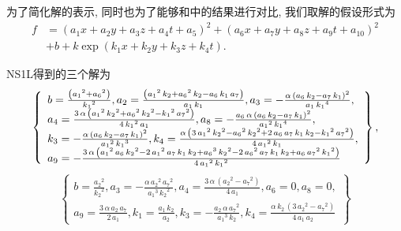 为了简化解的表示, 同时也为了能够和中的结果进行对比, 我们取解的假设形式为
\begin{equation}
\begin{split}
    f&=(a_1 x+a_2 y+a_3 z+ a_4 t +a_5)^2+(a_6 x+a_7 y+a_8 z+ a_9 t +a_{10})^2 \\
    &+b+k \exp(k_1 x + k_2 y +k_3 z+ k_4 t).
\end{split}
\end{equation}

NS1L得到的三个解为
\begin{eqnarray}
\renewcommand{\arraystretch}{1.2}
\left\{
\begin{array}{l}
b=\frac{\left( {{{a}_{1}}}^{2}+{{{a}_{6}}}^{2}\right) }{{{{k}_{1}}}^{2}},
{{a}_{2}}=\frac{\left( {{{a}_{1}}}^{2}\,{{k}_{2}}+{{{a}_{6}}}^{2}\,{{k}_{2}}-{{a}_{6}}\,{{k}_{1}}\,{{a}_{7}}\right) }{{{a}_{1}}\,{{k}_{1}}},
{{a}_{3}}=-\frac{\alpha\,\left( {{a}_{6}}\,{{k}_{2}}-{{a}_{7}}\,{{k}_{1}}\right) ^{2}}{{{a}_{1}}\,{{{k}_{1}}}^{4}},\\
{{a}_{4}}=\frac{3\,\alpha\,\left( {{{a}_{1}}}^{2}\,{{{k}_{2}}}^{2}+{{{a}_{6}}}^{2}\,{{{k}_{2}}}^{2}-{{{k}_{1}}}^{2}\,{{{a}_{7}}}^{2}\right) }{4\,{{{k}_{1}}}^{2}\,{{a}_{1}}},
{{a}_{8}}=-\frac{{{a}_{6}}\,\alpha\,\left( {{a}_{6}}\,{{k}_{2}}-{{a}_{7}}\,{{k}_{1}}\right) ^{2}}{{{{a}_{1}}}^{2}\,{{{k}_{1}}}^{4}},\\
{{k}_{3}}=-\frac{\alpha\,\left( {{a}_{6}}\,{{k}_{2}}-{{a}_{7}}\,{{k}_{1}}\right) ^{2}}{{{{a}_{1}}}^{2}\,{{{k}_{1}}}^{3}},
{{k}_{4}}=\frac{\alpha\,\left( 3\,{{{a}_{1}}}^{2}\,{{{k}_{2}}}^{2}-{{{a}_{6}}}^{2}\,{{{k}_{2}}}^{2}+2\,{{a}_{6}}\,{{a}_{7}}\,{{k}_{1}}\,{{k}_{2}}-{{{k}_{1}}}^{2}\,{{{a}_{7}}}^{2}\right) }{4\,{{{a}_{1}}}^{2}\,{{k}_{1}}},\\
{{a}_{9}}=-\frac{3\,\alpha\,\left( {{{a}_{1}}}^{2}\,{{a}_{6}}\,{{{k}_{2}}}^{2}-2\,{{{a}_{1}}}^{2}\,{{a}_{7}}\,{{k}_{1}}\,{{k}_{2}}+{{{a}_{6}}}^{3}\,{{{k}_{2}}}^{2}-2\,{{{a}_{6}}}^{2}\,{{a}_{7}}\,{{k}_{1}}\,{{k}_{2}}+{{a}_{6}}\,{{{a}_{7}}}^{2}\,{{{k}_{1}}}^{2}\right) }{4\,{{{a}_{1}}}^{2}\,{{{k}_{1}}}^{2}}\\
\end{array}
\right\}, \label{1S1L-1}
\end{eqnarray}
\begin{equation}
\renewcommand{\arraystretch}{1.2}
\left\{
\begin{array}{l}  
b=\frac{{{{a}_{2}}}^{2}}{{{{k}_{2}}}^{2}},
{{a}_{3}}=-\frac{\alpha\,{{{a}_{2}}}^{2}\,{{{a}_{7}}}^{2}}{{{{a}_{1}}}^{3}\,{{{k}_{2}}}^{2}},
{{a}_{4}}=\frac{3\,\alpha\,\left( {{{a}_{2}}}^{2}-{{{a}_{7}}}^{2}\right) }{4\,{{a}_{1}}},
{{a}_{6}}=0,
{{a}_{8}}=0,\\
{{a}_{9}}=\frac{3\,\alpha\,{{a}_{2}}\,{{a}_{7}}}{2\,{{a}_{1}}},
{{k}_{1}}=\frac{{{a}_{1}}\,{{k}_{2}}}{{{a}_{2}}},
{{k}_{3}}=-\frac{{{a}_{2}}\,\alpha\,{{{a}_{7}}}^{2}}{{{{a}_{1}}}^{3}\,{{k}_{2}}},
{{k}_{4}}=\frac{\alpha\,{{k}_{2}}\,\left( 3\,{{{a}_{2}}}^{2}-{{{a}_{7}}}^{2}\right) }{4\,{{a}_{1}}\,{{a}_{2}}}
\end{array}
\right\} \label{1S1L-2}
\end{equation}

